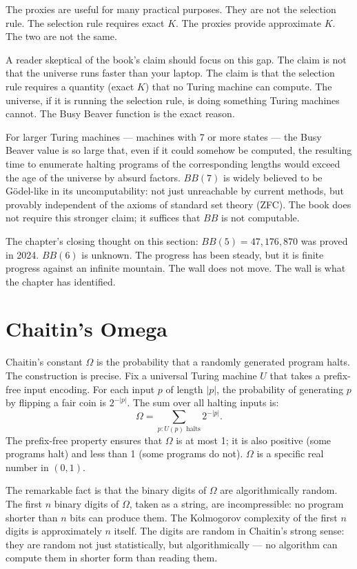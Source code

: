 The proxies are useful for many practical purposes. They are not
the selection rule. The selection rule requires exact $K$. The
proxies provide approximate $K$. The two are not the same.

A reader skeptical of the book's claim should focus on this gap.
The claim is not that the universe runs faster than your laptop.
The claim is that the selection rule requires a quantity (exact
$K$) that no Turing machine can compute. The universe, if it is
running the selection rule, is doing something Turing machines
cannot. The Busy Beaver function is the exact reason.

For larger Turing machines --- machines with 7 or more states ---
the Busy Beaver value is so large that, even if it could somehow
be computed, the resulting time to enumerate halting programs of
the corresponding lengths would exceed the age of the universe by
absurd factors. $BB(7)$ is widely believed to be G\"odel-like in
its uncomputability: not just unreachable by current methods, but
provably independent of the axioms of standard set theory (ZFC).
The book does not require this stronger claim; it suffices that
$BB$ is not computable.

The chapter's closing thought on this section: $BB(5) =
47{,}176{,}870$ was proved in 2024. $BB(6)$ is unknown. The
progress has been steady, but it is finite progress against an
infinite mountain. The wall does not move. The wall is what the
chapter has identified.

\section{Chaitin's Omega}
\label{se:chaitins-omega}

Chaitin's constant $\Omega$ is the probability that a randomly generated
program halts. The construction is precise. Fix a universal Turing
machine $U$ that takes a prefix-free input encoding. For each input $p$
of length $|p|$, the probability of generating $p$ by flipping a fair
coin is $2^{-|p|}$. The sum over all halting inputs is:
\[
\Omega = \sum_{p : U(p) \text{ halts}} 2^{-|p|}.
\]
The prefix-free property ensures that $\Omega$ is at most 1; it is also
positive (some programs halt) and less than 1 (some programs do not).
$\Omega$ is a specific real number in $(0, 1)$.

The remarkable fact is that the binary digits of $\Omega$ are
algorithmically random. The first $n$ binary digits of $\Omega$, taken
as a string, are incompressible: no program shorter than $n$ bits can
produce them. The Kolmogorov complexity of the first $n$ digits is
approximately $n$ itself. The digits are random in Chaitin's strong
sense: they are random not just statistically, but algorithmically ---
no algorithm can compute them in shorter form than reading them.

